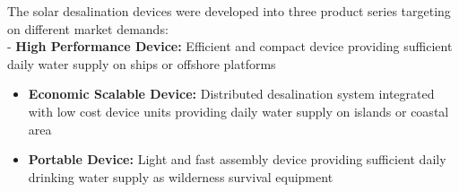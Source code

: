 \documentclass[
]{article}
\begin{document}
The solar desalination devices were developed into three product series
targeting on different market demands:\\
- \textbf{High Performance Device:} Efficient and compact device
providing sufficient daily water supply on ships or offshore platforms

\begin{itemize}
\item
  \textbf{Economic Scalable Device:} Distributed desalination system
  integrated with low cost device units providing daily water supply on
  islands or coastal area
\item
  \textbf{Portable Device:} Light and fast assembly device providing
  sufficient daily drinking water supply as wilderness survival
  equipment
\end{itemize}
\end{document}
